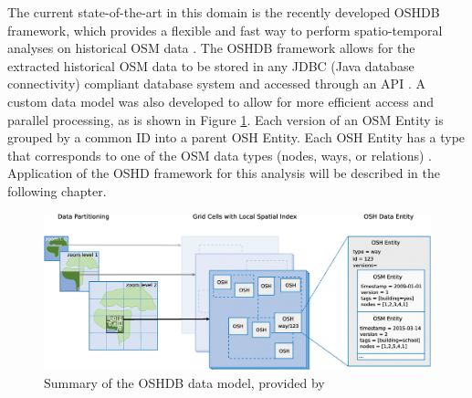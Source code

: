The current state-of-the-art in this domain is the recently developed OSHDB framework, which provides a flexible and fast way to perform spatio-temporal analyses on historical OSM data \parencite{raifer_oshdb_2019}. The OSHDB framework allows for the extracted historical OSM data to be stored in any JDBC (Java database connectivity) compliant database system and accessed through an API \parencite{raifer_oshdb_2019}. A custom data model was also developed to allow for more efficient access and parallel processing, as is shown in Figure \ref{fig:oshdb}. Each version of an OSM Entity is grouped by a common ID into a parent OSH Entity. Each OSH Entity has a type that corresponds to one of the OSM data types (nodes, ways, or relations) \parencite{raifer_oshdb_2019}. Application of the OSHD framework for this analysis will be described in the following chapter.

\begin{figure} %
    \centering %
    \includegraphics[width = \textwidth]{Images/oshdb.PNG} %
    \caption{Summary of the OSHDB data model, provided by \textcite{raifer_oshdb_2019}} %
    \label{fig:oshdb} %
\end{figure}




    



